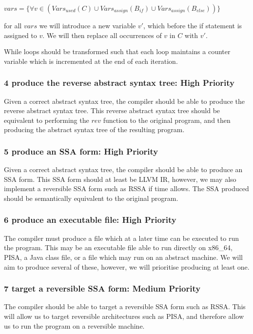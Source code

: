\begin{center}
$vars = \{\forall v \in (Vars_{used}(C) \cup Vars_{assign}(B_{if}) \cup Vars_{assign}(B_{else}))\}$
\end{center}

for all $vars$ we will introduce a new variable $v'$, which before the if statement is assigned to $v$.
We will then replace all occurrences of $v$ in $C$ with $v'$.

While loops should be transformed such that each loop maintains a counter variable which is incremented at the end of each iteration.

\subsubsection[4]{4 produce the reverse abstract syntax tree: High Priority}
Given a correct abstract syntax tree, the compiler should be able to produce the reverse abstract syntax tree.
This reverse abstract syntax tree should be equivalent to performing the $rev$ function to the original program, and then producing the abstract syntax tree of the resulting program.

\subsubsection[5]{5 produce an SSA form: High Priority}
Given a correct abstract syntax tree, the compiler should be able to produce an SSA form.
This SSA form should at least be LLVM IR, however, we may also implement a reversible SSA form such as RSSA if time allows.
The SSA produced should be semantically equivalent to the original program.

\subsubsection[6]{6 produce an executable file: High Priority}
The compiler must produce a file which at a later time can be executed to run the program.
This may be an executable file able to run directly on x86_64, PISA, a Java class file, or a file which may run on an abstract machine.
We will aim to produce several of these, however, we will prioritise producing at least one.

\subsubsection[7]{7 target a reversible SSA form: Medium Priority}
The compiler should be able to target a reversible SSA form such as RSSA.
This will allow us to target reversible architectures such as PISA, and therefore allow us to run the program on a reversible machine.

